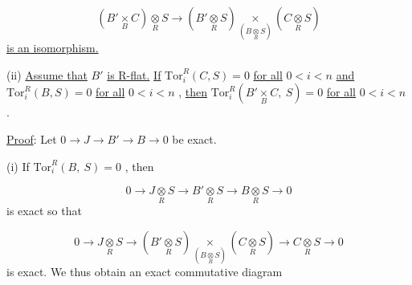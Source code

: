 \begin{equation*}
(B'\underset{B}{\times} C) \underset{R}{\otimes} S \to (B'\underset{R}{\otimes} S) \underset{(B \underset{R}{\otimes} S)}{\times} (C \underset{R}{\otimes} S)
\end{equation*}
\underline{is an isomorphism.}

(ii)  \underline{Assume that}  $B'$  \underline{is R-flat.} \underline{If}  $\mathrm{Tor}^{R}_{i}(C,S) = 0$  \underline{for all}  $0 < i < n$  \underline{and}  $\mathrm{Tor}^{R}_{i}(B,S) = 0$  \underline{for all}  $0 < i < n$  , \underline{then}  $\mathrm{Tor}^{R}_{i}(B'\underset{B}{\times}C,\ S) = 0$  \underline{for all}  $0 < i < n$  .

\underline{Proof}:  Let  $0 \to J \to B' \to B \to 0$  be exact.

(i)  If  $\mathrm{Tor}^{R}_{i}(B,\ S) = 0$  , then

\begin{equation*}
0 \to J\underset{R}{\otimes}S \to B'\underset{R}{\otimes}S \to B\underset{R}{\otimes}S \to 0
\end{equation*}
is exact so that

\begin{equation*}
0 \to J\underset{R}{\otimes}S \to (B'\underset{R}{\otimes}S) \underset{(B\underset{R}{\otimes}S)}{\times} (C\underset{R}{\otimes}S) \to C\underset{R}{\otimes}S \to 0
\end{equation*}
is exact. We thus obtain an exact commutative diagram



